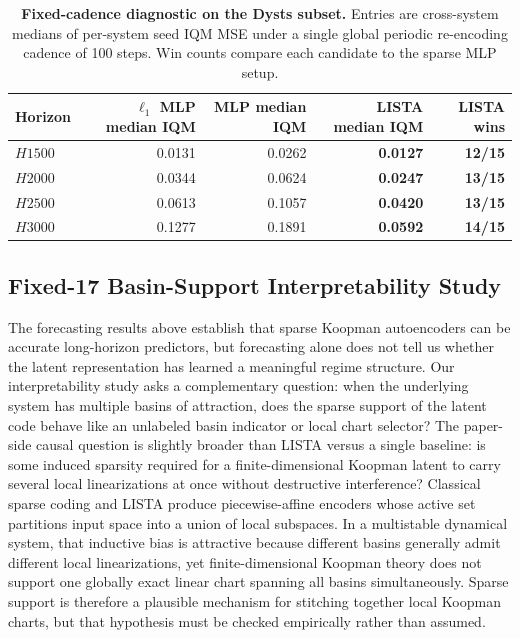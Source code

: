 \begin{table}[ht]
\centering
\scriptsize
\setlength{\tabcolsep}{5pt}
\begin{tabular}{lrrrr}
\toprule
Horizon & $\ell_1$ MLP median IQM & MLP median IQM & LISTA median IQM & LISTA wins \\
\midrule
$H1500$ & 0.0131 & 0.0262 & \textbf{0.0127}  & \textbf{12/15} \\
$H2000$ & 0.0344 & 0.0624 & \textbf{0.0247} & \textbf{13/15} \\
$H2500$ & 0.0613 & 0.1057 & \textbf{0.0420} & \textbf{13/15} \\
$H3000$ & 0.1277 & 0.1891 & \textbf{0.0592} & \textbf{14/15} \\
\bottomrule
\end{tabular}
\caption{\textbf{Fixed-cadence diagnostic on the Dysts subset.} Entries are cross-system medians of per-system seed IQM MSE under a single global periodic re-encoding cadence of 100 steps. Win counts compare each candidate to the sparse MLP setup.}
\label{tab:dysts-fixed-cadence}
\end{table}

\subsection{Fixed-17 Basin-Support Interpretability Study}
\label{sec:fixed17-interpretability}

The forecasting results above establish that sparse Koopman autoencoders can
be accurate long-horizon predictors, but forecasting alone does not tell us
whether the latent representation has learned a meaningful regime structure.
Our interpretability study asks a complementary question: when the underlying
system has multiple basins of attraction, does the sparse support of the latent
code behave like an unlabeled basin indicator or local chart selector? The
paper-side causal question is slightly broader than LISTA versus a single
baseline: is some induced sparsity required for a finite-dimensional Koopman
latent to carry several local linearizations at once without destructive
interference? Classical sparse coding and LISTA produce piecewise-affine
encoders whose active set partitions input space into a union of local
subspaces. In a multistable dynamical system, that inductive bias is
attractive because different basins generally admit different local
linearizations, yet finite-dimensional Koopman theory does not support one
globally exact linear chart spanning all basins simultaneously. Sparse support
is therefore a plausible mechanism for stitching together local Koopman
charts, but that hypothesis must be checked empirically rather than assumed.

